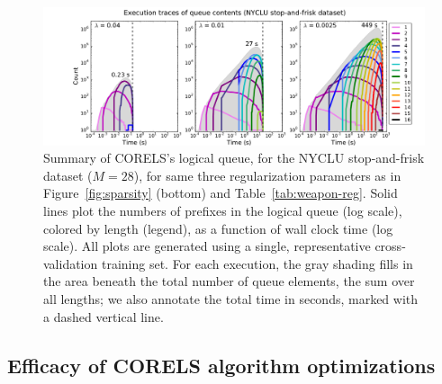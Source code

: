 \begin{figure}[t!]
\begin{center}
\includegraphics[trim={30mm 0mm 15mm 5mm},
width=\textwidth]{figs/weapon_reg-queue.pdf}
\end{center}
\vspace{-5mm}
\caption{Summary of CORELS's logical queue,
for the NYCLU stop-and-frisk dataset (${M = 28}$),
for same three regularization parameters as in Figure~\ref{fig:sparsity} (bottom)
and Table~\ref{tab:weapon-reg}.
%
Solid lines plot the numbers of prefixes in the logical queue (log scale), colored by length (legend),
as a function of wall clock time (log scale).
%
All plots are generated using a single, representative cross-validation training set.
%
For each execution, the gray shading fills in the area beneath the total number
of queue elements, \ie the sum over all lengths;
we also annotate the total time in seconds, marked with a dashed vertical line.
}
\label{fig:queue-weapon-reg}
\end{figure}

\subsection{Efficacy of CORELS algorithm optimizations}
\label{sec:ablation}

